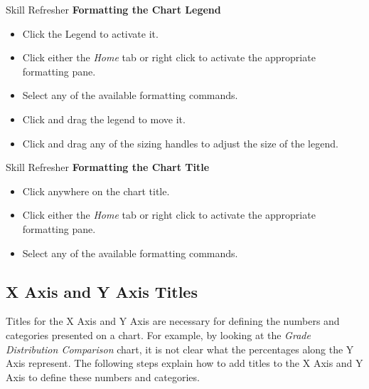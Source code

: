 \begin{center}
	\begin{sklbox}{Skill Refresher}
		\textbf{Formatting the Chart Legend}
		\\
		\begin{itemize}
			\setlength{\itemsep}{0pt}
			\setlength{\parskip}{0pt}
			\setlength{\parsep}{0pt}

			\item Click the Legend to activate it.
			\item Click either the \textit{Home} tab or right click to activate the appropriate formatting pane.
			\item Select any of the available formatting commands.
			\item Click and drag the legend to move it.
			\item Click and drag any of the sizing handles to adjust the size of the legend.
			
		\end{itemize}
	\end{sklbox}
\end{center}

\begin{center}
	\begin{sklbox}{Skill Refresher}
		\textbf{Formatting the Chart Title}
		\\
		\begin{itemize}
			\setlength{\itemsep}{0pt}
			\setlength{\parskip}{0pt}
			\setlength{\parsep}{0pt}

			\item Click anywhere on the chart title.
			\item Click either the \textit{Home} tab or right click to activate the appropriate formatting pane.
			\item Select any of the available formatting commands.
			
		\end{itemize}
	\end{sklbox}
\end{center}

\subsection{X Axis and Y Axis Titles}

Titles for the X Axis and Y Axis are necessary for defining the numbers and categories presented on a chart. For example, by looking at the \textit{Grade Distribution Comparison} chart, it is not clear what the percentages along the Y Axis represent. The following steps explain how to add titles to the X Axis and Y Axis to define these numbers and categories.

